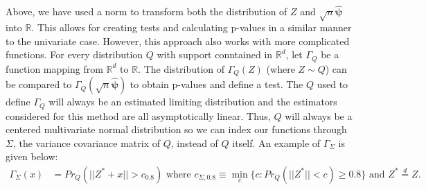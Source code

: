 \documentclass{article}
\newcommand{\vmat}{\Sigma}
\newcommand{\disto}{P}
\newcommand{\rvv}{Z}
\newcommand{\distv}{Q}
\begin{document}
Above, we have used a norm to transform both the distribution of $\rvv$ and $\sqrt{n}\hat{\boldsymbol{\psi}}$ into $\mathbb{R}$.  This allows for creating tests and calculating p-values in a similar manner to the univariate case. 
However, this approach also works with more complicated functions.  For every distribution $\distv$ with support conntained in $\mathbb{R}^d$, let $\Gamma_{\distv}$ be a function mapping from  $\mathbb{R}^d$ to $\mathbb{R}$.
The distribution of $\Gamma_\distv(\rvv)$ (where $\rvv \sim \distv$)
can be compared to $\Gamma_\distv(\sqrt{n}\hat{\boldsymbol{\psi}})$ to obtain p-values and define a test. The $\distv$ used to define $\Gamma_\distv$ will always be an estimated limiting distribution and the estimators considered for this method are all asymptotically linear. Thus, $\distv$ will always be a centered multivariate normal distribution so we can index our functions through $\vmat$, the variance covariance matrix of $\distv$, instead of $\distv$ itself. An example of $\Gamma_\vmat$ is given below:
\begin{align}
	\Gamma_\vmat(x) &= Pr_\distv(||\rvv^* + x|| > c_{0.8})  \text{ where }  c_{\vmat, 0.8} \equiv \min_{c}\{c : Pr_\distv(||\rvv^*|| < c) \geq 0.8 \} \text{ and } \rvv^* \overset{d}{=} \rvv. \label{gamma:pow}
\end{align}
\end{document}
